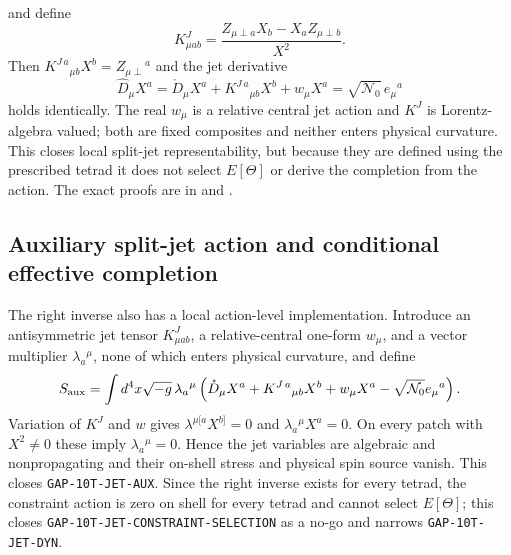 \documentclass[12pt,a4paper]{article}
\theoremstyle{remark}\newtheorem{remark}[definition]{Remark}
\begin{document}
and define
\begin{equation}
 K^J_{\mu ab}=\frac{Z_{\mu\perp a}X_b-X_aZ_{\mu\perp b}}{X^2}.
 \label{eq:split-jet-K-paper}
\end{equation}
Then $K^{J\,a}{}_{\mu b}X^b=Z_{\mu\perp}{}^a$ and the jet derivative
\begin{equation}
 \widehat D_\mu X^a=\mathring D_\mu X^a
 +K^{J\,a}{}_{\mu b}X^b+w_\mu X^a
 =\sqrt{\mathcal N_0}\,e_\mu{}^a
 \label{eq:split-jet-right-inverse-paper}
\end{equation}
holds identically.  The real $w_\mu$ is a relative central jet action and
$K^J$ is Lorentz-algebra valued; both are fixed composites and neither enters
physical curvature.  This closes local split-jet representability, but because
they are defined using the prescribed tetrad it does not select $E[\Theta]$ or
derive the completion from the action.  The exact proofs are in
 and
.

\subsection{Auxiliary split-jet action and conditional effective completion}
The right inverse also has a local action-level implementation.  Introduce an
antisymmetric jet tensor $K^J_{\mu ab}$, a relative-central one-form $w_\mu$,
and a vector multiplier $\lambda_a{}^\mu$, none of which enters physical
curvature, and define
\begin{equation}
 S_{\rm aux}=\int d^4x\sqrt{-g}\,\lambda_a{}^\mu
 \left(\mathring D_\mu X^a+K^{J\,a}{}_{\mu b}X^b
 +w_\mu X^a-\sqrt{\mathcal N_0}e_\mu{}^a\right).
 \label{eq:Saux-paper}
\end{equation}
Variation of $K^J$ and $w$ gives
$\lambda^{\mu[a}X^{b]}=0$ and $\lambda_a{}^\mu X^a=0$.  On every patch with
$X^2\ne0$ these imply $\lambda_a{}^\mu=0$.  Hence the jet variables are
algebraic and nonpropagating and their on-shell stress and physical spin source
vanish.  This closes \texttt{GAP-10T-JET-AUX}.  Since the right inverse exists
for every tetrad, the constraint action is zero on shell for every tetrad and
cannot select $E[\Theta]$; this closes
\texttt{GAP-10T-JET-CONSTRAINT-SELECTION} as a no-go and narrows
\texttt{GAP-10T-JET-DYN}.
\end{document}
